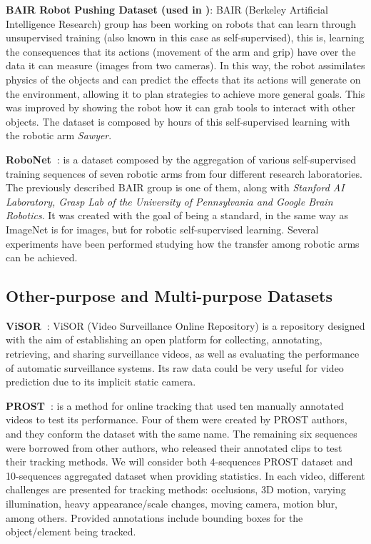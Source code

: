 \vspace*{0.1cm}\noindent\textbf{BAIR Robot Pushing Dataset (used in \cite{Ebert2017})}: BAIR (Berkeley Artificial Intelligence Research) group has been working on robots that can learn through unsupervised training (also known in this case as self-supervised), this is, learning the consequences that its actions (movement of the arm and grip) have over the data it can measure (images from two cameras). In this way, the robot assimilates physics of the objects and can predict the effects that its actions will generate on the environment, allowing it to plan strategies to achieve more general goals. This was improved by showing the robot how it can grab tools to interact with other objects. The dataset is composed by hours of this self-supervised learning with the robotic arm \textit{Sawyer}.

\vspace*{0.1cm}\noindent\textbf{RoboNet~\cite{Dasari2019}}: is a dataset composed by the aggregation of various self-supervised training sequences of seven robotic arms from four different research laboratories. The previously described BAIR group is one of them, along with \textit{Stanford AI Laboratory, \textit{Grasp Lab of the University of Pennsylvania} and \textit{Google Brain Robotics}}. It was created with the goal of being a standard, in the same way as ImageNet is for images, but for robotic self-supervised learning. Several experiments have been performed studying how the transfer among robotic arms can be achieved.

\vspace*{0.1cm}\noindent\subsection{Other-purpose and Multi-purpose Datasets}
\textbf{ViSOR~\cite{Vezzani2010}}: ViSOR (Video Surveillance Online Repository) is a repository designed with the aim of establishing an open platform for collecting, annotating, retrieving, and sharing surveillance videos, as well as evaluating the performance of automatic surveillance systems. Its raw data could be very useful for video prediction due to its implicit static camera.

\vspace*{0.1cm}\noindent\textbf{PROST~\cite{Santner2010}}: is a method for online tracking that used ten manually annotated videos to test its performance. Four of them were created by PROST authors, and they conform the dataset with the same name. The remaining six sequences were borrowed from other authors, who released their annotated clips to test their tracking methods. We will consider both 4-sequences PROST dataset and 10-sequences aggregated dataset when providing statistics. In each video, different challenges are presented for tracking methods: occlusions, 3D motion, varying illumination, heavy appearance/scale changes, moving camera, motion blur, among others. Provided annotations include bounding boxes for the object/element being tracked.

